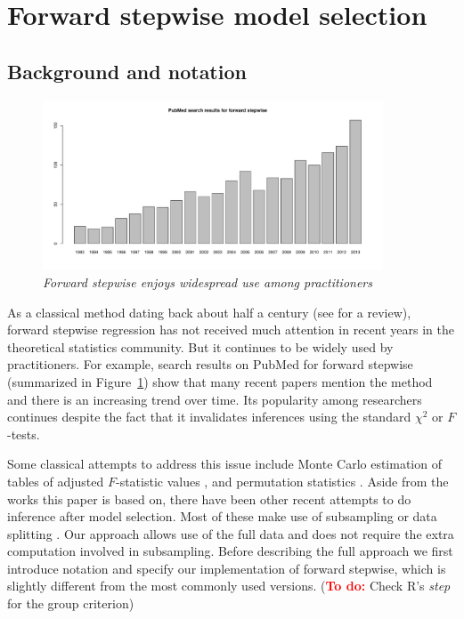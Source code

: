 \documentclass{imsart}
\newcommand{\todo}{\textcolor{red}{\textbf{To do: }}}
\begin{document}
\section{Forward stepwise model selection}
\label{sec:stepwise}

\subsection{Background and notation}

\begin{figure}
\begin{center}
\includegraphics[width=0.9\textwidth]{../figs/pubmed.pdf}
\caption{\small \it Forward stepwise enjoys widespread use among
practitioners}
\label{fig:pubmed}
\end{center}
\end{figure}


As a classical method dating back about half a century
(see \cite{classical:selection} for a review),
forward stepwise regression has not received much attention in
recent years in the theoretical statistics community. But it continues
to be widely used by practitioners.
For example, search results on PubMed for forward stepwise
(summarized in Figure~\ref{fig:pubmed}) show that many recent
papers mention the method and there is an increasing trend over time.
Its popularity among researchers continues despite the fact that it
invalidates inferences using the standard $\chi^2$ or $F$-tests.


Some classical attempts to address this issue include Monte Carlo
estimation of tables of adjusted $F$-statistic values \citep{mc:ftoenter},
and permutation statistics \citep{permutation:stop}. Aside from the works
this paper is based on, there have been other recent attempts to do
inference after model selection. Most of these make use of subsampling
\citep{meinshausen:buhlmann} or data splitting \citep{wasserman:roeder}.
Our approach allows use of the full data and does not require the
extra computation involved in subsampling.
Before describing the full approach we first introduce notation and
specify our implementation of forward stepwise, which is slightly
different from the most commonly used versions.
(\todo Check R's \textit{step} for the group criterion)
\end{document}
